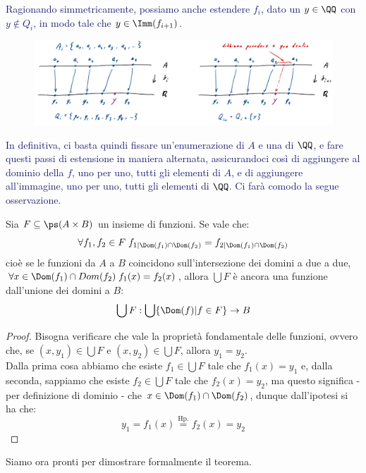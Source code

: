 \textcolor{MidnightBlue}{Ragionando simmetricamente, possiamo anche estendere $f_i$, dato un $y \in \QQ$ con $y \not\in Q_i$, in modo tale che $y \in \Imm(f_{i+1})$.}

\begin{figure}[H]
	\centering
	\includegraphics[width = 12cm]{immagini/IsoCantor2.png}
\end{figure}

\textcolor{MidnightBlue}{In definitiva, ci basta quindi fissare un'enumerazione di $A$ e una di $\QQ$, e fare questi passi di estensione in maniera alternata, assicurandoci così di aggiungere al dominio della $f$, uno per uno,
tutti gli elementi di $A$, e di aggiungere all'immagine, uno per uno, tutti gli elementi di $\QQ$. Ci farà comodo la segue osservazione.}

\begin{remark}
	Sia $F \subseteq \ps(A \times B)$ un insieme di funzioni. Se vale che:	
	\[ \forall f_1,f_2 \in F \; f_{1|\Dom(f_1) \cap \Dom(f_2)} = f_{2|\Dom(f_1) \cap \Dom(f_2)}
			\]
	cioè se le funzioni da $A$ a $B$ coincidono sull'intersezione dei domini a due a due, $\forall x \in \Dom(f_1) \cap Dom(f_2) \; f_1(x) = f_2(x)$, allora $\bigcup F$ è ancora una funzione dall'unione dei domini a $B$:
	\[ \bigcup F : \bigcup\{\Dom(f) | f\in F\} \rightarrow B
		\]
\end{remark}

\begin{proof}
	Bisogna verificare che vale la proprietà fondamentale delle funzioni, ovvero che, se $(x,y_1) \in \bigcup F$ e $(x,y_2) \in \bigcup F$, allora $y_1 = y_2$.\\
	Dalla prima cosa abbiamo che esiste $f_1 \in \bigcup F$ tale che $f_1(x) = y_1$ e, dalla seconda, sappiamo che esiste $f_2 \in \bigcup F$ tale che $f_2(x) = y_2$, ma questo significa - per definizione di dominio -
	che $x \in \Dom(f_1) \cap \Dom(f_2)$, dunque dall'ipotesi si ha che:
	\[ y_1 = f_1(x) \overset{\text{Hp.}}{=} f_2(x) = y_2
		\]
\end{proof}

Siamo ora pronti per dimostrare formalmente il teorema.

